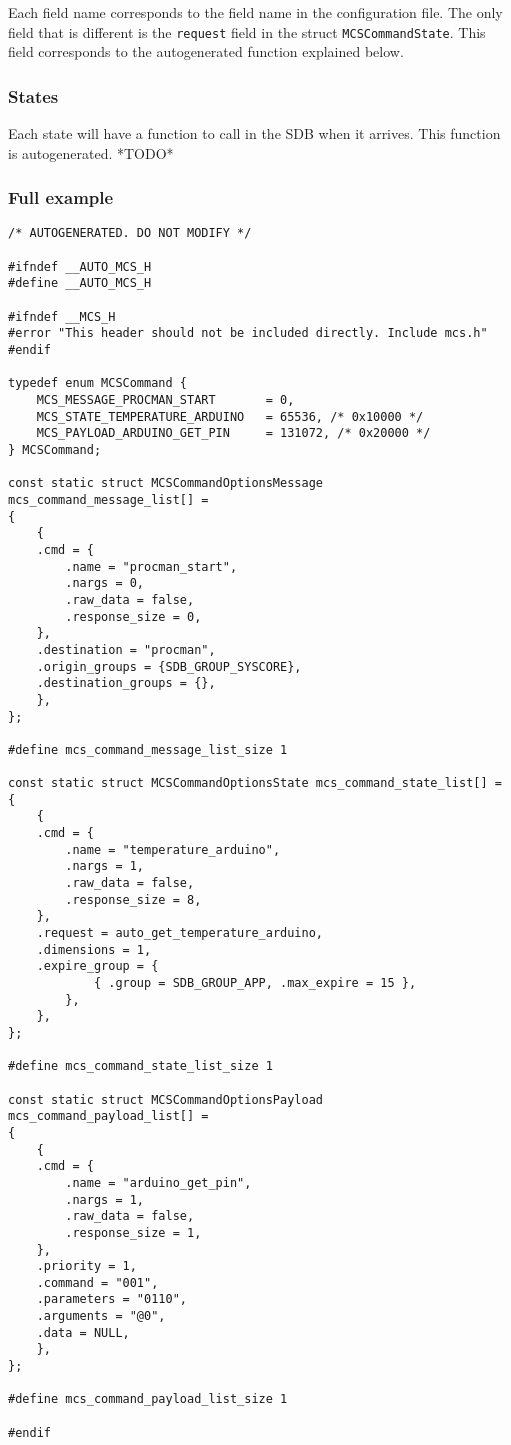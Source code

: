 \documentclass[12pt,a4paper]{report}
\begin{document}
Each field name corresponds to the field name in the configuration file. The only field that is different is the \texttt{request} field in the struct \texttt{MCSCommandState}. This field corresponds to the autogenerated function explained below.

\subsubsection*{States}
Each state will have a function to call in the SDB when it arrives. This function is autogenerated.
*TODO*

\subsubsection{Full example}
\begin{lstlisting}
/* AUTOGENERATED. DO NOT MODIFY */

#ifndef __AUTO_MCS_H
#define __AUTO_MCS_H

#ifndef __MCS_H
#error "This header should not be included directly. Include mcs.h"
#endif

typedef enum MCSCommand {
    MCS_MESSAGE_PROCMAN_START       = 0,
    MCS_STATE_TEMPERATURE_ARDUINO   = 65536, /* 0x10000 */
    MCS_PAYLOAD_ARDUINO_GET_PIN     = 131072, /* 0x20000 */
} MCSCommand;

const static struct MCSCommandOptionsMessage mcs_command_message_list[] =
{
    {
    .cmd = {
        .name = "procman_start",
        .nargs = 0,
        .raw_data = false,
        .response_size = 0,
    },
    .destination = "procman",
    .origin_groups = {SDB_GROUP_SYSCORE},
    .destination_groups = {},
    },
};

#define mcs_command_message_list_size 1

const static struct MCSCommandOptionsState mcs_command_state_list[] =
{
    {
    .cmd = {
        .name = "temperature_arduino",
        .nargs = 1,
        .raw_data = false,
        .response_size = 8,
    },
    .request = auto_get_temperature_arduino,
    .dimensions = 1,
    .expire_group = {
            { .group = SDB_GROUP_APP, .max_expire = 15 },
        },
    },
};

#define mcs_command_state_list_size 1

const static struct MCSCommandOptionsPayload mcs_command_payload_list[] =
{
    {
    .cmd = {
        .name = "arduino_get_pin",
        .nargs = 1,
        .raw_data = false,
        .response_size = 1,
    },
    .priority = 1,
    .command = "001",
    .parameters = "0110",
    .arguments = "@0",
    .data = NULL,
    },
};

#define mcs_command_payload_list_size 1

#endif
\end{lstlisting}
\end{document}
